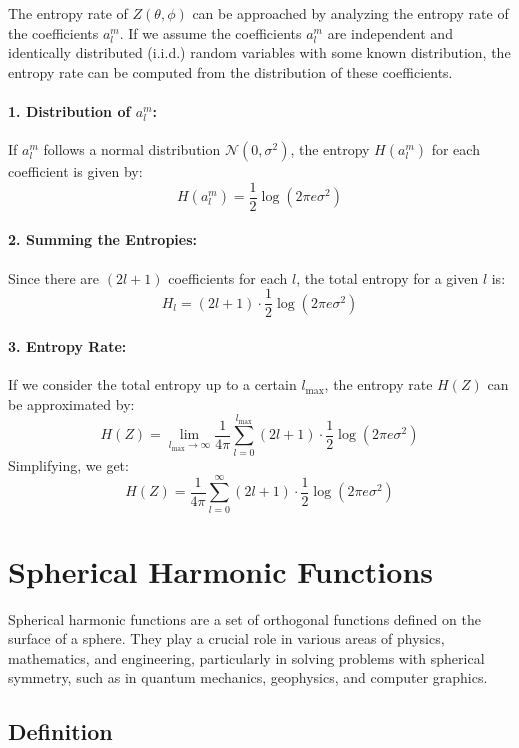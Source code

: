 The entropy rate of \( Z(\theta, \phi) \) can be approached by analyzing the entropy rate of the coefficients \( a_l^m \). If we assume the coefficients \( a_l^m \) are independent and identically distributed (i.i.d.) random variables with some known distribution, the entropy rate can be computed from the distribution of these coefficients.

\paragraph*{1. Distribution of \( a_l^m \):}
If \( a_l^m \) follows a normal distribution \( \mathcal{N}(0, \sigma^2) \), the entropy \( H(a_l^m) \) for each coefficient is given by:
\[
H(a_l^m) = \frac{1}{2} \log (2\pi e \sigma^2)
\]

\paragraph*{2. Summing the Entropies:}
Since there are \((2l+1)\) coefficients for each \( l \), the total entropy for a given \( l \) is:
\[
H_l = (2l + 1) \cdot \frac{1}{2} \log (2\pi e \sigma^2)
\]

\paragraph*{3. Entropy Rate:}
If we consider the total entropy up to a certain \( l_{\text{max}} \), the entropy rate \( H(Z) \) can be approximated by:
\[
H(Z) = \lim_{l_{\text{max}} \to \infty} \frac{1}{4\pi} \sum_{l=0}^{l_{\text{max}}} (2l + 1) \cdot \frac{1}{2} \log (2\pi e \sigma^2)
\]
Simplifying, we get:
\[
H(Z) = \frac{1}{4\pi} \sum_{l=0}^{\infty} (2l + 1) \cdot \frac{1}{2} \log (2\pi e \sigma^2)
\]


	
\section*{Spherical Harmonic Functions}

Spherical harmonic functions are a set of orthogonal functions defined on the surface of a sphere. They play a crucial role in various areas of physics, mathematics, and engineering, particularly in solving problems with spherical symmetry, such as in quantum mechanics, geophysics, and computer graphics.

\subsection*{Definition}

